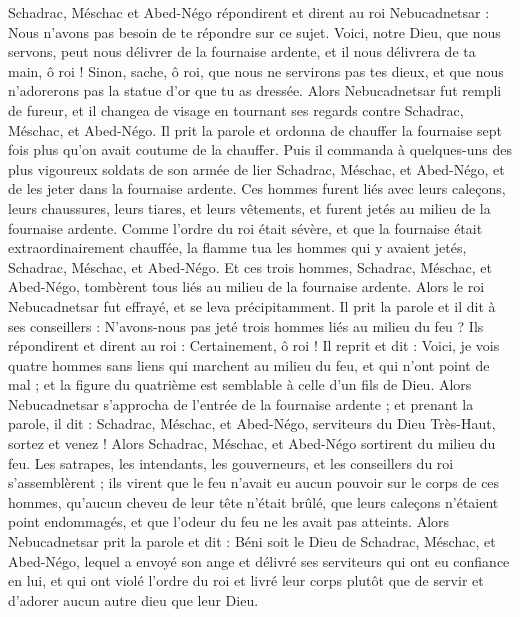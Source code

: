 \begin{multicols}{2}
Schadrac, Méschac et Abed-Négo répondirent et dirent au roi Nebucadnetsar : Nous n’avons pas besoin de te répondre sur ce sujet.
Voici, notre Dieu, que nous servons, peut nous délivrer de la fournaise ardente, et il nous délivrera de ta main, ô roi !
Sinon, sache, ô roi, que nous ne servirons pas tes dieux, et que nous n’adorerons pas la statue d'or que tu as dressée.
Alors Nebucadnetsar fut rempli de fureur, et il changea de visage en tournant ses regards contre Schadrac, Méschac, et Abed-Négo. Il prit la parole et ordonna de chauffer la fournaise sept fois plus qu’on avait coutume de la chauffer.
Puis il commanda à quelques-uns des plus vigoureux soldats de son armée de lier Schadrac, Méschac, et Abed-Négo, et de les jeter dans la fournaise ardente.
Ces hommes furent liés avec leurs caleçons, leurs chaussures, leurs tiares, et leurs vêtements, et furent jetés au milieu de la fournaise ardente.
Comme l’ordre du roi était sévère, et que la fournaise était extraordinairement chauffée, la flamme tua les hommes qui y avaient jetés, Schadrac, Méschac, et Abed-Négo.
Et ces trois hommes, Schadrac, Méschac, et Abed-Négo, tombèrent tous liés au milieu de la fournaise ardente.
Alors le roi Nebucadnetsar fut effrayé, et se leva précipitamment. Il prit la parole et il dit à ses conseillers : N'avons-nous pas jeté trois hommes liés  au milieu du feu ? Ils répondirent et dirent au roi : Certainement, ô roi !
Il reprit et dit : Voici, je vois quatre hommes sans liens qui marchent au milieu du feu, et qui n’ont point de mal ; et la figure du quatrième est semblable à celle d’un fils de Dieu.
Alors Nebucadnetsar s'approcha de l’entrée de la fournaise ardente ; et prenant la parole, il dit : Schadrac, Méschac, et Abed-Négo, serviteurs du Dieu Très-Haut, sortez et venez ! Alors Schadrac, Méschac, et Abed-Négo sortirent du milieu du feu.
Les satrapes, les intendants, les gouverneurs, et les conseillers du roi s'assemblèrent ; ils virent que le feu n'avait eu aucun pouvoir sur le corps de ces hommes, qu’aucun cheveu de leur tête n’était brûlé, que leurs caleçons n’étaient point endommagés, et que l’odeur du feu ne les avait pas atteints.
Alors Nebucadnetsar prit la parole et dit : Béni soit le Dieu de Schadrac, Méschac, et Abed-Négo, lequel a envoyé son ange et délivré ses serviteurs qui ont eu confiance en lui, et qui ont violé l’ordre du roi et livré leur corps plutôt que de servir et d’adorer aucun autre dieu  que leur Dieu.

\end{multicols}
